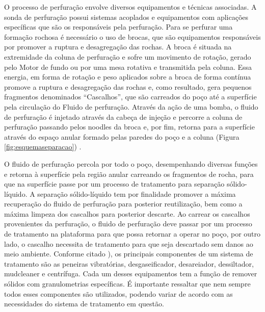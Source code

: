 O processo de perfuração envolve diversos equipamentos e técnicas associadas. A sonda de perfuração possui sistemas acoplados e equipamentos com aplicações específicas que são os responsáveis pela perfuração. Para se perfurar uma formação rochosa é necessário o uso de brocas, que são equipamentos responsáveis por promover a ruptura e desagregação das rochas. A broca é situada na extremidade da coluna de perfuração e sofre um movimento de rotação, gerado pelo Motor de fundo ou por uma mesa rotativa e transmitida pela coluna. Essa energia, em forma de rotação e peso aplicados sobre a broca de forma contínua promove a ruptura e desagregação das rochas e, como resultado, gera pequenos fragmentos denominados “Cascalhos”, que são carreados do poço até a superfície pela circulação do Fluido de perfuração. Através da ação de uma bomba, o fluido de perfuração é injetado através da cabeça de injeção e percorre a coluna de perfuração passando pelos noodles da broca e, por fim, retorna para a superfície através do espaço anular formado pelas paredes do poço e a coluna (Figura \ref{fig:esquemaseparacao}) \cite{thomas}.


O fluido de perfuração percola por todo o poço, desempenhando diversas funções e retorna à superfície pela região anular carreando os fragmentos de rocha, para que na superfície passe por um processo de tratamento para separação sólido-líquido. A separação sólido-líquido tem por finalidade promover a máxima recuperação do fluido de perfuração para posterior reutilização, bem como a máxima limpeza dos cascalhos para posterior descarte. Ao carrear os cascalhos provenientes da perfuração, o fluido de perfuração deve passar por um processo de tratamento na plataforma para que possa retornar a operar no poço, por outro lado, o cascalho necessita de tratamento para que seja descartado sem danos ao meio ambiente. Conforme citado ), os principais componentes de um sistema de tratamento são as peneiras vibratórias, desgaseificador, desareiador, dessiltador, mudcleaner e centrífuga. Cada um desses equipamentos tem a função de remover sólidos com granulometrias específicas. É importante ressaltar que nem sempre todos esses componentes são utilizados, podendo variar de acordo com as necessidades do sistema de tratamento em questão.

